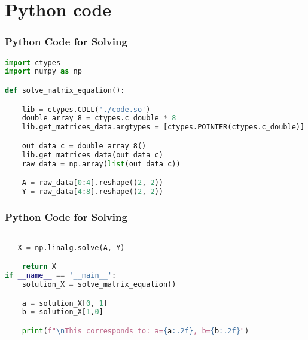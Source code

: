 \documentclass{beamer}
\theoremstyle{remark}
\numberwithin{equation}{section}
\begin{document}
\section{Python code}
\begin{frame}[fragile]
\frametitle{Python Code for Solving}
\begin{lstlisting}[language=Python]
import ctypes
import numpy as np

def solve_matrix_equation():

    lib = ctypes.CDLL('./code.so')
    double_array_8 = ctypes.c_double * 8
    lib.get_matrices_data.argtypes = [ctypes.POINTER(ctypes.c_double)]

    out_data_c = double_array_8()
    lib.get_matrices_data(out_data_c)
    raw_data = np.array(list(out_data_c))

    A = raw_data[0:4].reshape((2, 2))
    Y = raw_data[4:8].reshape((2, 2))


\end{lstlisting}
\end{frame}
 \begin{frame}[fragile]
\frametitle{Python Code for Solving}
\begin{lstlisting}[language=Python]

   X = np.linalg.solve(A, Y)

    return X
if __name__ == '__main__':
    solution_X = solve_matrix_equation()

    a = solution_X[0, 1]
    b = solution_X[1,0]

    print(f"\nThis corresponds to: a={a:.2f}, b={b:.2f}")


\end{lstlisting}
\end{frame}
\end{document}
